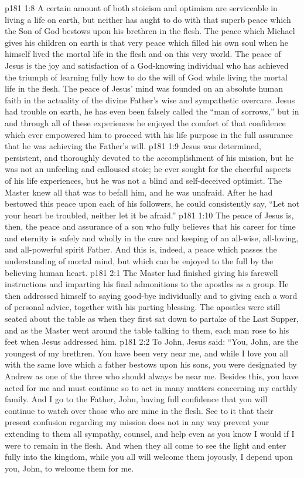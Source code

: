 \vs p181 1:8 A certain amount of both stoicism and optimism are serviceable in living a life on earth, but neither has aught to do with that superb peace which the Son of God bestows upon his brethren in the flesh. The peace which Michael gives his children on earth is that very peace which filled his own soul when he himself lived the mortal life in the flesh and on this very world. The peace of Jesus is the joy and satisfaction of a God\hyp{}knowing individual who has achieved the triumph of learning fully how to do the will of God while living the mortal life in the flesh. The peace of Jesus’ mind was founded on an absolute human faith in the actuality of the divine Father’s wise and sympathetic overcare. Jesus had trouble on earth, he has even been falsely called the “man of sorrows,” but in and through all of these experiences he enjoyed the comfort of that confidence which ever empowered him to proceed with his life purpose in the full assurance that he was achieving the Father’s will.
\vs p181 1:9 Jesus was determined, persistent, and thoroughly devoted to the accomplishment of his mission, but he was not an unfeeling and calloused stoic; he ever sought for the cheerful aspects of his life experiences, but he was not a blind and self\hyp{}deceived optimist. The Master knew all that was to befall him, and he was unafraid. After he had bestowed this peace upon each of his followers, he could consistently say, \textcolor{ubdarkred}{“Let not your heart be troubled, neither let it be afraid.”}
\vs p181 1:10 The peace of Jesus is, then, the peace and assurance of a son who fully believes that his career for time and eternity is safely and wholly in the care and keeping of an all\hyp{}wise, all\hyp{}loving, and all\hyp{}powerful spirit Father. And this is, indeed, a peace which passes the understanding of mortal mind, but which can be enjoyed to the full by the believing human heart.
\vs p181 2:1 The Master had finished giving his farewell instructions and imparting his final admonitions to the apostles as a group. He then addressed himself to saying good\hyp{}bye individually and to giving each a word of personal advice, together with his parting blessing. The apostles were still seated about the table as when they first sat down to partake of the Last Supper, and as the Master went around the table talking to them, each man rose to his feet when Jesus addressed him.
\pc \vs p181 2:2 To John, Jesus said: \textcolor{ubdarkred}{“You, John, are the youngest of my brethren. You have been very near me, and while I love you all with the same love which a father bestows upon his sons, you were designated by Andrew as one of the three who should always be near me. Besides this, you have acted for me and must continue so to act in many matters concerning my earthly family. And I go to the Father, John, having full confidence that you will continue to watch over those who are mine in the flesh. See to it that their present confusion regarding my mission does not in any way prevent your extending to them all sympathy, counsel, and help even as you know I would if I were to remain in the flesh. And when they all come to see the light and enter fully into the kingdom, while you all will welcome them joyously, I depend upon you, John, to welcome them for me.}
